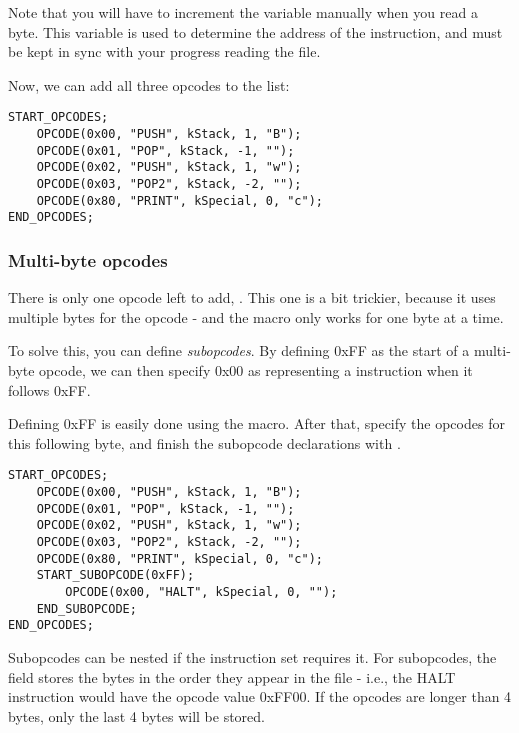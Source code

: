 Note that you will have to increment the  variable manually when you read a byte. This variable is used to determine the address of the instruction, and must be kept in sync with your progress reading the file.

Now, we can add all three opcodes to the list:

\begin{C++}
\begin{lstlisting}
START_OPCODES;
	OPCODE(0x00, "PUSH", kStack, 1, "B");
	OPCODE(0x01, "POP", kStack, -1, "");
	OPCODE(0x02, "PUSH", kStack, 1, "w");
	OPCODE(0x03, "POP2", kStack, -2, "");
	OPCODE(0x80, "PRINT", kSpecial, 0, "c");
END_OPCODES;
\end{lstlisting}
\end{C++}

\subsubsection{Multi-byte opcodes}
There is only one opcode left to add, . This one is a bit trickier, because it uses multiple bytes for the opcode - and the  macro only works for one byte at a time.

To solve this, you can define \emph{subopcodes}. By defining 0xFF as the start of a multi-byte opcode, we can then specify 0x00 as representing a  instruction when it follows 0xFF.

Defining 0xFF is easily done using the  macro. After that, specify the opcodes for this following byte, and finish the subopcode declarations with .

\begin{C++}
\begin{lstlisting}
START_OPCODES;
	OPCODE(0x00, "PUSH", kStack, 1, "B");
	OPCODE(0x01, "POP", kStack, -1, "");
	OPCODE(0x02, "PUSH", kStack, 1, "w");
	OPCODE(0x03, "POP2", kStack, -2, "");
	OPCODE(0x80, "PRINT", kSpecial, 0, "c");
	START_SUBOPCODE(0xFF);
		OPCODE(0x00, "HALT", kSpecial, 0, "");
	END_SUBOPCODE;
END_OPCODES;
\end{lstlisting}
\end{C++}

Subopcodes can be nested if the instruction set requires it. For subopcodes, the  field stores the bytes in the order they appear in the file - i.e., the HALT instruction would have the opcode value 0xFF00. If the opcodes are longer than 4 bytes, only the last 4 bytes will be stored.

